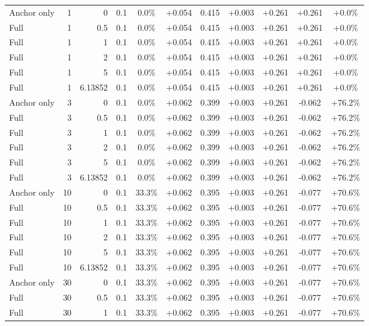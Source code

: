 \begin{table}[htbp]
\begin{tabular}{lrrrccccccc}
Anchor only & 1 & 0 & 0.1 & 0.0\% & +0.054 & 0.415 & +0.003 & +0.261 & +0.261 & +0.0\% \\
Full & 1 & 0.5 & 0.1 & 0.0\% & +0.054 & 0.415 & +0.003 & +0.261 & +0.261 & +0.0\% \\
Full & 1 & 1 & 0.1 & 0.0\% & +0.054 & 0.415 & +0.003 & +0.261 & +0.261 & +0.0\% \\
Full & 1 & 2 & 0.1 & 0.0\% & +0.054 & 0.415 & +0.003 & +0.261 & +0.261 & +0.0\% \\
Full & 1 & 5 & 0.1 & 0.0\% & +0.054 & 0.415 & +0.003 & +0.261 & +0.261 & +0.0\% \\
Full & 1 & 6.13852 & 0.1 & 0.0\% & +0.054 & 0.415 & +0.003 & +0.261 & +0.261 & +0.0\% \\
Anchor only & 3 & 0 & 0.1 & 0.0\% & +0.062 & 0.399 & +0.003 & +0.261 & -0.062 & +76.2\% \\
Full & 3 & 0.5 & 0.1 & 0.0\% & +0.062 & 0.399 & +0.003 & +0.261 & -0.062 & +76.2\% \\
Full & 3 & 1 & 0.1 & 0.0\% & +0.062 & 0.399 & +0.003 & +0.261 & -0.062 & +76.2\% \\
Full & 3 & 2 & 0.1 & 0.0\% & +0.062 & 0.399 & +0.003 & +0.261 & -0.062 & +76.2\% \\
Full & 3 & 5 & 0.1 & 0.0\% & +0.062 & 0.399 & +0.003 & +0.261 & -0.062 & +76.2\% \\
Full & 3 & 6.13852 & 0.1 & 0.0\% & +0.062 & 0.399 & +0.003 & +0.261 & -0.062 & +76.2\% \\
Anchor only & 10 & 0 & 0.1 & 33.3\% & +0.062 & 0.395 & +0.003 & +0.261 & -0.077 & +70.6\% \\
Full & 10 & 0.5 & 0.1 & 33.3\% & +0.062 & 0.395 & +0.003 & +0.261 & -0.077 & +70.6\% \\
Full & 10 & 1 & 0.1 & 33.3\% & +0.062 & 0.395 & +0.003 & +0.261 & -0.077 & +70.6\% \\
Full & 10 & 2 & 0.1 & 33.3\% & +0.062 & 0.395 & +0.003 & +0.261 & -0.077 & +70.6\% \\
Full & 10 & 5 & 0.1 & 33.3\% & +0.062 & 0.395 & +0.003 & +0.261 & -0.077 & +70.6\% \\
Full & 10 & 6.13852 & 0.1 & 33.3\% & +0.062 & 0.395 & +0.003 & +0.261 & -0.077 & +70.6\% \\
Anchor only & 30 & 0 & 0.1 & 33.3\% & +0.062 & 0.395 & +0.003 & +0.261 & -0.077 & +70.6\% \\
Full & 30 & 0.5 & 0.1 & 33.3\% & +0.062 & 0.395 & +0.003 & +0.261 & -0.077 & +70.6\% \\
Full & 30 & 1 & 0.1 & 33.3\% & +0.062 & 0.395 & +0.003 & +0.261 & -0.077 & +70.6\% \\

\end{tabular}
\end{table}
